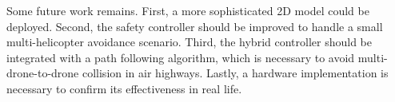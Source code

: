 \documentclass[journal,11pt,onecolumn,draftclsnofoot,]{IEEEtran}
\begin{document}
Some future work remains. First, a more sophisticated 2D model could be deployed. Second, the safety controller should be improved to handle a small multi-helicopter avoidance scenario. Third, the hybrid controller should be integrated with a path following algorithm, which is necessary to avoid multi-drone-to-drone collision in air highways. Lastly, a hardware implementation is necessary to confirm its effectiveness in real life.

%
%
%
%
%
%
%
\end{document}
